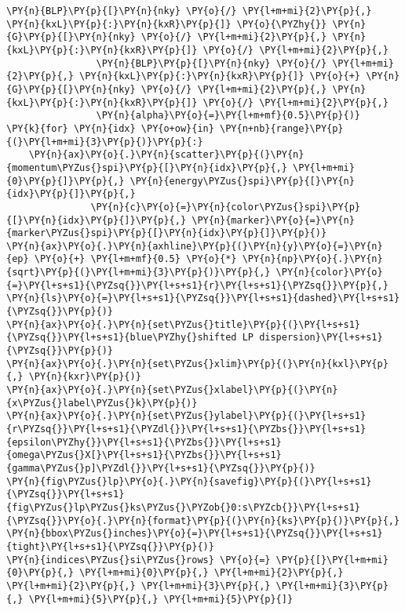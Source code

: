 \begin{Verbatim}[commandchars=\\\{\}]
                \PY{n}{BLP}\PY{p}{[}\PY{n}{nky} \PY{o}{/} \PY{l+m+mi}{2}\PY{p}{,} \PY{n}{kxL}\PY{p}{:}\PY{n}{kxR}\PY{p}{]} \PY{o}{\PYZhy{}} \PY{n}{G}\PY{p}{[}\PY{n}{nky} \PY{o}{/} \PY{l+m+mi}{2}\PY{p}{,} \PY{n}{kxL}\PY{p}{:}\PY{n}{kxR}\PY{p}{]} \PY{o}{/} \PY{l+m+mi}{2}\PY{p}{,}
                \PY{n}{BLP}\PY{p}{[}\PY{n}{nky} \PY{o}{/} \PY{l+m+mi}{2}\PY{p}{,} \PY{n}{kxL}\PY{p}{:}\PY{n}{kxR}\PY{p}{]} \PY{o}{+} \PY{n}{G}\PY{p}{[}\PY{n}{nky} \PY{o}{/} \PY{l+m+mi}{2}\PY{p}{,} \PY{n}{kxL}\PY{p}{:}\PY{n}{kxR}\PY{p}{]} \PY{o}{/} \PY{l+m+mi}{2}\PY{p}{,}
                \PY{n}{alpha}\PY{o}{=}\PY{l+m+mf}{0.5}\PY{p}{)}
\PY{k}{for} \PY{n}{idx} \PY{o+ow}{in} \PY{n+nb}{range}\PY{p}{(}\PY{l+m+mi}{3}\PY{p}{)}\PY{p}{:}
    \PY{n}{ax}\PY{o}{.}\PY{n}{scatter}\PY{p}{(}\PY{n}{momentum\PYZus{}spi}\PY{p}{[}\PY{n}{idx}\PY{p}{,} \PY{l+m+mi}{0}\PY{p}{]}\PY{p}{,} \PY{n}{energy\PYZus{}spi}\PY{p}{[}\PY{n}{idx}\PY{p}{]}\PY{p}{,}
               \PY{n}{c}\PY{o}{=}\PY{n}{color\PYZus{}spi}\PY{p}{[}\PY{n}{idx}\PY{p}{]}\PY{p}{,} \PY{n}{marker}\PY{o}{=}\PY{n}{marker\PYZus{}spi}\PY{p}{[}\PY{n}{idx}\PY{p}{]}\PY{p}{)}
\PY{n}{ax}\PY{o}{.}\PY{n}{axhline}\PY{p}{(}\PY{n}{y}\PY{o}{=}\PY{n}{ep} \PY{o}{+} \PY{l+m+mf}{0.5} \PY{o}{*} \PY{n}{np}\PY{o}{.}\PY{n}{sqrt}\PY{p}{(}\PY{l+m+mi}{3}\PY{p}{)}\PY{p}{,} \PY{n}{color}\PY{o}{=}\PY{l+s+s1}{\PYZsq{}}\PY{l+s+s1}{r}\PY{l+s+s1}{\PYZsq{}}\PY{p}{,} \PY{n}{ls}\PY{o}{=}\PY{l+s+s1}{\PYZsq{}}\PY{l+s+s1}{dashed}\PY{l+s+s1}{\PYZsq{}}\PY{p}{)}
\PY{n}{ax}\PY{o}{.}\PY{n}{set\PYZus{}title}\PY{p}{(}\PY{l+s+s1}{\PYZsq{}}\PY{l+s+s1}{blue\PYZhy{}shifted LP dispersion}\PY{l+s+s1}{\PYZsq{}}\PY{p}{)}
\PY{n}{ax}\PY{o}{.}\PY{n}{set\PYZus{}xlim}\PY{p}{(}\PY{n}{kxl}\PY{p}{,} \PY{n}{kxr}\PY{p}{)}
\PY{n}{ax}\PY{o}{.}\PY{n}{set\PYZus{}xlabel}\PY{p}{(}\PY{n}{x\PYZus{}label\PYZus{}k}\PY{p}{)}
\PY{n}{ax}\PY{o}{.}\PY{n}{set\PYZus{}ylabel}\PY{p}{(}\PY{l+s+s1}{r\PYZsq{}}\PY{l+s+s1}{\PYZdl{}}\PY{l+s+s1}{\PYZbs{}}\PY{l+s+s1}{epsilon\PYZhy{}}\PY{l+s+s1}{\PYZbs{}}\PY{l+s+s1}{omega\PYZus{}X[}\PY{l+s+s1}{\PYZbs{}}\PY{l+s+s1}{gamma\PYZus{}p]\PYZdl{}}\PY{l+s+s1}{\PYZsq{}}\PY{p}{)}
\PY{n}{fig\PYZus{}lp}\PY{o}{.}\PY{n}{savefig}\PY{p}{(}\PY{l+s+s1}{\PYZsq{}}\PY{l+s+s1}{fig\PYZus{}lp\PYZus{}ks\PYZus{}\PYZob{}0:s\PYZcb{}}\PY{l+s+s1}{\PYZsq{}}\PY{o}{.}\PY{n}{format}\PY{p}{(}\PY{n}{ks}\PY{p}{)}\PY{p}{,} \PY{n}{bbox\PYZus{}inches}\PY{o}{=}\PY{l+s+s1}{\PYZsq{}}\PY{l+s+s1}{tight}\PY{l+s+s1}{\PYZsq{}}\PY{p}{)}
\PY{n}{indices\PYZus{}si\PYZus{}rows} \PY{o}{=} \PY{p}{[}\PY{l+m+mi}{0}\PY{p}{,} \PY{l+m+mi}{0}\PY{p}{,} \PY{l+m+mi}{2}\PY{p}{,} \PY{l+m+mi}{2}\PY{p}{,} \PY{l+m+mi}{3}\PY{p}{,} \PY{l+m+mi}{3}\PY{p}{,} \PY{l+m+mi}{5}\PY{p}{,} \PY{l+m+mi}{5}\PY{p}{]}

\end{Verbatim}
